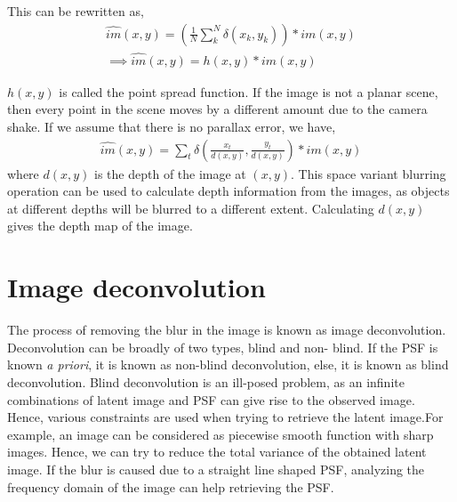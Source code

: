 \documentclass[BTech]{iitmdiss}
\begin{document}
This can be rewritten as,
\begin{align*}
\hat{im}(x,y) = (\frac{1}{N}\sum_k^N\delta(x_k, y_k))*im(x,y)\\
\implies \hat{im}(x,y) = h(x,y)*im(x,y)
\end{align*}

$h(x,y)$ is called the point spread function. If the image is not a 
planar scene, then every point in the scene moves by a different amount
due to the camera shake. If we assume that there is no parallax error,
we have,
\begin{align*}
\hat{im}(x,y) = \sum_t\delta(\frac{x_t}{d(x,y)}, \frac{y_t}{d(x,y)})*im(x,y)
\end{align*}
where $d(x,y)$ is the depth of the image at $(x,y)$. This space variant
blurring operation can be used to calculate depth information from the 
images, as objects at different depths will be blurred to a different
extent. Calculating $d(x,y)$ gives the depth map of the image.

\section{Image deconvolution}
\label{basic_theory:deconv}
The process of removing the blur in the image is known as image
deconvolution. Deconvolution can be broadly of two types, blind and non-
blind. If the PSF is known \emph{a priori}, it is known as non-blind 
deconvolution, else, it is known as blind deconvolution. 
Blind deconvolution is an ill-posed problem, as an infinite combinations of 
latent image and PSF can give rise to the observed image. Hence, various
constraints are used when trying to retrieve the latent image\citet{fergus2006removing, krishnan2009fast, levin2007deconvolution,gupta2010single}.For example, an image can be considered as piecewise smooth function with
sharp images. Hence, we can try to reduce the total variance of the 
obtained latent image\citet{money2006total,chan1998total}. If the blur
is caused due to a straight line shaped PSF, analyzing the frequency
domain of the image can help retrieving the PSF\cite{oliveira2007blind}.
\end{document}
